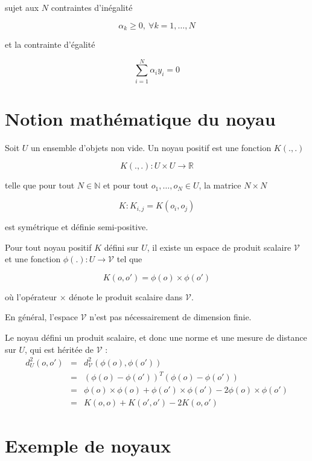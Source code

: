 sujet aux $N$ contraintes d'inégalité

$$\alpha_k \geq 0, \: \forall k = 1, \dots , N$$

et la contrainte d'égalité

$$\sum_{i = 1}^N \alpha_i y_i = 0$$

\section{Notion mathématique du noyau}

Soit $U$ un ensemble d'objets non vide. Un noyau positif est une fonction $K(., .)$

$$K(.,.) : U \times U \rightarrow \mathbb{R}$$

telle que pour tout $N \in \mathbb{N}$ et pour tout $o_1, \dots , o_N \in U$, la matrice $N \times N$

$$K : K_{i, j} = K(o_i, o_j)$$

est symétrique et définie semi-positive.

Pour tout noyau positif $K$ défini sur $U$, il existe un espace de produit scalaire $\mathcal{V}$ et une fonction $\phi(.) : U \rightarrow \mathcal{V}$ tel que

$$K(o, o') = \phi(o) \times \phi(o')$$

où l'opérateur $\times$ dénote le produit scalaire dans $\mathcal{V}$.

En général, l'espace $\mathcal{V}$ n'est pas nécessairement de dimension finie.

Le noyau défini un produit scalaire, et donc une norme et une mesure de distance sur $U$, qui est héritée de $\mathcal{V}$ :
\begin{eqnarray*}
d^2_U(o, o') & = & d^2_\mathcal{V}(\phi(o), \phi(o')) \\
 & = & (\phi(o) - \phi(o'))^T(\phi(o) - \phi(o')) \\
 & = & \phi(o) \times \phi(o) + \phi(o') \times \phi(o') - 2 \phi(o) \times \phi(o') \\
 & = & K(o, o) + K(o', o') - 2 K(o, o')
\end{eqnarray*}

\section{Exemple de noyaux}

